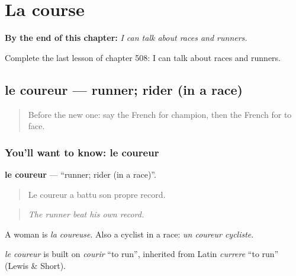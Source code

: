 
\chapter{La course}
\label{ch:fr-la-course}

\begin{chapteropening}
\textbf{By the end of this chapter:} \emph{I can talk about races and runners.}

Complete the last lesson of chapter 508: I can talk about races and runners.
\end{chapteropening}

\section[le coureur]{le coureur — runner; rider (in a race)}

\label{lesson:FR-C508-coureur}



\begin{quote}
Before the new one: say the French for champion, then the French for to face.
\end{quote}

\subsection*{You'll want to know: le coureur}
\textbf{le coureur} — \textquotedblleft{}runner; rider (in a race)\textquotedblright{}.

\begin{quote}
Le coureur a battu son propre record.
\end{quote}

\begin{quote}
\emph{The runner beat his own record.}
\end{quote}

A woman is \emph{la coureuse}. Also a cyclist in a race: \emph{un coureur cycliste}.

\begin{cousinweb}
\emph{le coureur} is built on \emph{courir} \textquotedblleft{}to run\textquotedblright{}, inherited from Latin \emph{currere} \textquotedblleft{}to run\textquotedblright{} (Lewis \& Short).
\end{cousinweb}

